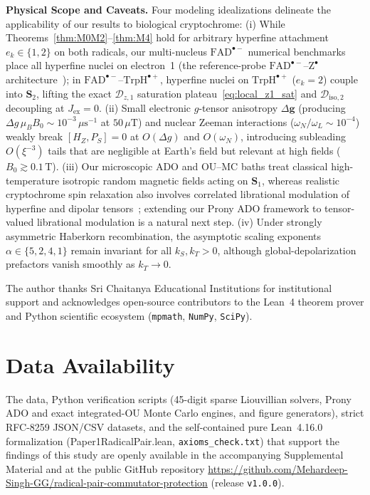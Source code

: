 \documentclass[twocolumn,10pt,amsmath,amssymb,floatfix]{revtex4-2}
\theoremstyle{plain}
\theoremstyle{definition}
\newcommand{\PS}{P_S}
\newcommand{\HZ}{H_Z}
\newcommand{\leanid}[1]{{\footnotesize\ttfamily\def\_{\textunderscore\allowbreak}#1}}
\begin{document}
\noindent\textbf{Physical Scope and Caveats.} Four modeling idealizations delineate the applicability of our results to biological cryptochrome:
(i) While Theorems~\ref{thm:M0M2}--\ref{thm:M4} hold for arbitrary hyperfine attachment $e_k \in \{1,2\}$ on both radicals, our multi-nucleus $\mathrm{FAD}^{\bullet-}$ numerical benchmarks place all hyperfine nuclei on electron~1 (the reference-probe $\mathrm{FAD}^{\bullet-}\text{--}\mathrm{Z}^{\bullet}$ architecture~\cite{Lee2014JRSocInterface}); in $\mathrm{FAD}^{\bullet-}\text{--}\mathrm{TrpH}^{\bullet+}$, hyperfine nuclei on $\mathrm{TrpH}^{\bullet+}$ ($e_k=2$) couple into $\mathbf{S}_2$, lifting the exact $\mathcal{D}_{z,1}$ saturation plateau~\eqref{eq:local_z1_sat} and $\mathcal{D}_{\mathrm{iso},2}$ decoupling at $J_{\mathrm{ex}}=0$.
(ii) Small electronic $g$-tensor anisotropy $\Delta\mathbf{g}$ (producing $\Delta g\,\mu_B B_0 \sim 10^{-3}\,\mu\text{s}^{-1}$ at $50\,\mu\text{T}$) and nuclear Zeeman interactions ($\omega_N/\omega_L \sim 10^{-4}$) weakly break $[\HZ,\PS]=0$ at $O(\Delta g)$ and $O(\omega_N)$, introducing subleading $O(\xi^{-3})$ tails that are negligible at Earth's field but relevant at high fields ($B_0 \gtrsim 0.1\,\text{T}$).
(iii) Our microscopic ADO and OU--MC baths treat classical high-temperature isotropic random magnetic fields acting on $\mathbf{S}_1$, whereas realistic cryptochrome spin relaxation also involves correlated librational modulation of hyperfine and dipolar tensors~\cite{Kattnig2016PCCP,Kattnig2016NJP,Fay2019JCP}; extending our Prony ADO framework to tensor-valued librational modulation is a natural next step.
(iv) Under strongly asymmetric Haberkorn recombination, the asymptotic scaling exponents $\alpha \in \{5,2,4,1\}$ remain invariant for all $k_S, k_T > 0$, although global-depolarization prefactors vanish smoothly as $k_T \to 0$.

\begin{acknowledgments}
The author thanks Sri Chaitanya Educational Institutions for institutional support and acknowledges open-source contributors to the Lean~4 theorem prover and Python scientific ecosystem (\texttt{mpmath}, \texttt{NumPy}, \texttt{SciPy}).
\end{acknowledgments}

\section*{Data Availability}
{\def\UrlBreaks{\do\/\do-}%
The data, Python verification scripts (45-digit sparse Liouvillian solvers, Prony ADO and exact integrated-OU Monte Carlo engines, and figure generators), strict RFC-8259 JSON/CSV datasets, and the self-contained pure Lean~4.16.0 formalization (\leanid{Paper1\_RadicalPair.lean}, \texttt{axioms\_check.txt}) that support the findings of this study are openly available in the accompanying Supplemental Material and at the public GitHub repository \url{https://github.com/Mehardeep-Singh-GG/radical-pair-commutator-protection} (release \texttt{v1.0.0}).%
}
\end{document}

